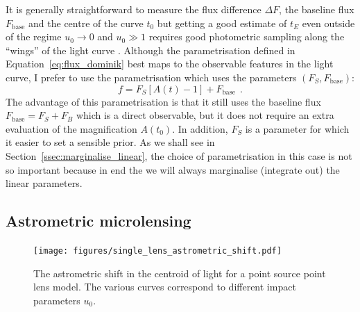 \documentclass[12pt,dvipsnames]{report}
\newcommand{\hquad}{~~}
\begin{document}
It is generally straightforward to measure the flux difference $\Delta F$, the
baseline flux $F_\mathrm{base}$ and the centre of the curve $t_0$ but getting a
good estimate of $t_E$ even outside of the regime $u_0\rightarrow 0$ and
$u_0\gg 1$ requires good photometric sampling along the ``wings'' of the light
curve \citep{2009MNRAS.393..816D}.
Although the parametrisation defined in Equation~\ref{eq:flux_dominik} best maps to 
the observable features in the light curve, I prefer to use the parametrisation which 
uses the parameters $(F_S,F_\mathrm{base})$:
\begin{equation}
    f=F_S\left[A(t) - 1\right]+F_\mathrm{base}
    \hquad.
    \label{eq:lin_flux_parameters}
\end{equation}
The advantage of this parametrisation is that it still uses the baseline flux 
$F_\mathrm{base}=F_S+F_B$ which is a direct observable, but it does not require an extra evaluation 
of the magnification $A(t_0)$. In addition, $F_S$ is a parameter for which it easier to 
set a sensible prior.
As we shall see in Section~\ref{ssec:marginalise_linear}, the choice of parametrisation in
this case is not so important because in end the we will always marginalise (integrate out)
the linear parameters.

\subsection{Astrometric microlensing}
\label{ssec:astrometric_microlensing}
\begin{figure}[t]
    \begin{centering}
        \texttt{[image: figures/single\_lens\_astrometric\_shift.pdf]}
        \caption{
            The astrometric shift in the centroid of light for a point source point lens
            model.
            The various curves correspond to different impact parameters $u_0$.}
        \label{fig:single_lens_astrometric_shift}
    \end{centering}
\end{figure}
\end{document}
